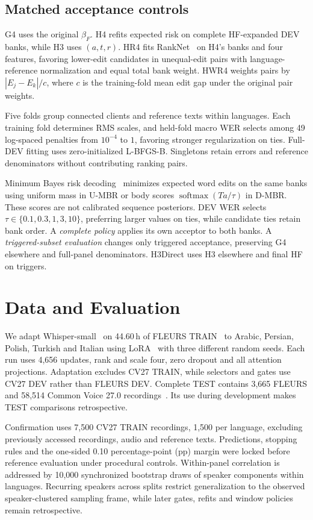 \documentclass[conference,letterpaper]{IEEEtran}
\begin{document}
\subsection{Matched acceptance controls}
G4 uses the original $\beta_F$. H4 refits expected risk on complete HF-expanded DEV banks, while H3 uses $(a,t,r)$. HR4 fits RankNet~\cite{ranknet2005} on H4's banks and four features, favoring lower-edit candidates in unequal-edit pairs with language-reference normalization and equal total bank weight. HWR4 weights pairs by $|E_j-E_k|/c$, where $c$ is the training-fold mean edit gap under the original pair weights.

Five folds group connected clients and reference texts within languages. Each training fold determines RMS scales, and held-fold macro WER selects among 49 log-spaced penalties from $10^{-4}$ to $1$, favoring stronger regularization on ties. Full-DEV fitting uses zero-initialized L-BFGS-B. Singletons retain errors and reference denominators without contributing ranking pairs.

Minimum Bayes risk decoding~\cite{goel2000mbr} minimizes expected word edits on the same banks using uniform mass in U-MBR or body scores $\operatorname{softmax}(Ta/\tau)$ in D-MBR. These scores are not calibrated sequence posteriors. DEV WER selects $\tau\in\{0.1,0.3,1,3,10\}$, preferring larger values on ties, while candidate ties retain bank order. A \emph{complete policy} applies its own acceptor to both banks. A \emph{triggered-subset evaluation} changes only triggered acceptance, preserving G4 elsewhere and full-panel denominators. H3Direct uses H3 elsewhere and final HF on triggers.

\section{Data and Evaluation}
We adapt Whisper-small~\cite{whisper} on 44.60\,h of FLEURS TRAIN~\cite{fleurs} to Arabic, Persian, Polish, Turkish and Italian using LoRA~\cite{lora} with three different random seeds. Each run uses 4,656 updates, rank and scale four, zero dropout and all attention projections. Adaptation excludes CV27 TRAIN, while selectors and gates use CV27 DEV rather than FLEURS DEV. Complete TEST contains 3,665 FLEURS and 58,514 Common Voice 27.0 recordings~\cite{cv2020}. Its use during development makes TEST comparisons retrospective.

Confirmation uses 7,500 CV27 TRAIN recordings, 1,500 per language, excluding previously accessed recordings, audio and reference texts. Predictions, stopping rules and the one-sided 0.10 percentage-point (pp) margin were locked before reference evaluation under procedural controls. Within-panel correlation is addressed by 10,000 synchronized bootstrap draws of speaker components within languages. Recurring speakers across splits restrict generalization to the observed speaker-clustered sampling frame, while later gates, refits and window policies remain retrospective.
\end{document}
